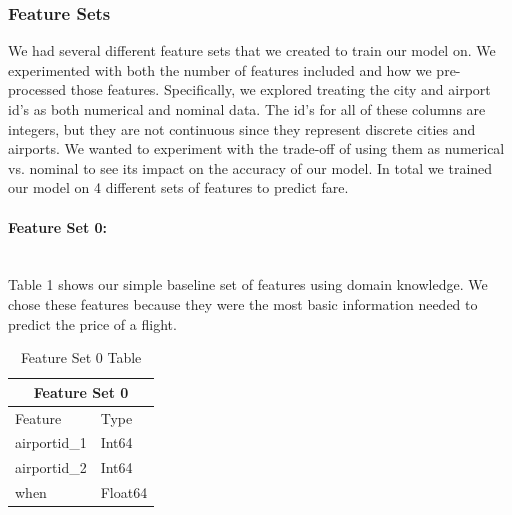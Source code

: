 \documentclass{article}
\begin{document}
\subsubsection{Feature Sets}
We had several different feature sets that we created to train our model on. We experimented with both the number of features included and how we pre-processed those features. Specifically, we explored treating the city and airport id’s as both numerical and nominal data. The id's for all of these columns are integers, but they are not continuous since they represent discrete cities and airports. We wanted to experiment with the trade-off of using them as numerical vs. nominal to see its impact on the accuracy of our model. In total we trained our model on 4 different sets of features to predict fare. 


\paragraph{Feature Set 0:}
\\Table 1 shows our simple baseline set of features using domain knowledge. We chose these features because they were the most basic information needed to predict the price of a flight.
\begin{table}[h!]
\centering
\begin{tabular}{ |p{3cm}||p{3cm}|  }
 \hline
 \multicolumn{2}{|c|}{Feature Set 0} \\
 \hline Feature & Type\\
 \hline
airportid\_1 & Int64 \\ 
airportid\_2 & Int64 \\
when & Float64 \\
 \hline
\end{tabular}
\caption{Feature Set 0 Table}
\label{table:1}
\end{table}
\end{document}

